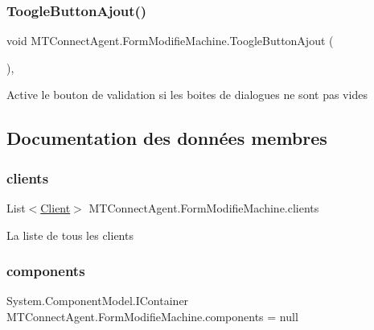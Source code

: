 \subsubsection{\texorpdfstring{Toogle\+Button\+Ajout()}{ToogleButtonAjout()}}
{\footnotesize\ttfamily void M\+T\+Connect\+Agent.\+Form\+Modifie\+Machine.\+Toogle\+Button\+Ajout (\begin{DoxyParamCaption}{ }\end{DoxyParamCaption})\hspace{0.3cm}{\ttfamily [inline]}, {\ttfamily [private]}}



Active le bouton de validation si les boites de dialogues ne sont pas vides 



\subsection{Documentation des données membres}
\mbox{\label{class_m_t_connect_agent_1_1_form_modifie_machine_a62e4eec844c191c07dde494ceaeed749}} 
\subsubsection{\texorpdfstring{clients}{clients}}
{\footnotesize\ttfamily List$<$\mbox{\hyperlink{class_m_t_connect_agent_1_1_model_1_1_client}{Client}}$>$ M\+T\+Connect\+Agent.\+Form\+Modifie\+Machine.\+clients\hspace{0.3cm}{\ttfamily [private]}}



La liste de tous les clients 

\mbox{\label{class_m_t_connect_agent_1_1_form_modifie_machine_a4338fbfc4a2b9f5dd3951a1cf87eeaca}} 
\subsubsection{\texorpdfstring{components}{components}}
{\footnotesize\ttfamily System.\+Component\+Model.\+I\+Container M\+T\+Connect\+Agent.\+Form\+Modifie\+Machine.\+components = null\hspace{0.3cm}{\ttfamily [private]}}



